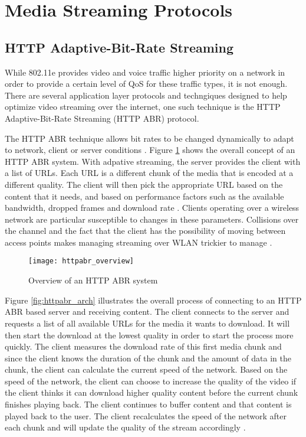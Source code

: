\documentclass[12pt]{article}
\begin{document}
\section{Media Streaming Protocols}

\subsection{HTTP Adaptive-Bit-Rate Streaming}
While 802.11e provides video and voice traffic higher priority on a network in order to provide a certain level of QoS for these traffic types, it is not enough.  There are several application layer protocols and techngiques designed to help optimize video streaming over the internet, one such technique is the HTTP Adaptive-Bit-Rate Streaming (HTTP ABR) protocol.

The HTTP ABR technique allows bit rates to be changed dynamically to adapt to network, client or server conditions \cite{7380453}.  Figure \ref{fig:httpabr_overview} shows the overall concept of an HTTP ABR system. With adpative streaming, the server provides the client with a list of URLs.  Each URL is a different chunk of the media that is encoded at a different quality.  The client will then pick the appropriate URL based on the content that it needs, and based on performance factors such as the available bandwidth, dropped frames and download rate \cite{httpabrtutorial}\cite{7057917}. Clients operating over a wireless network are particular susceptible to changes in these parameters.  Collisions over the channel and the fact that the client has the possibility of moving between access points makes managing streaming over WLAN trickier to manage \cite{10204452020150501}.

\begin{figure}[htb]
  \begin{center}
    \texttt{[image: httpabr\_overview]}
    \caption{Overview of an HTTP ABR system}
    \label{fig:httpabr_overview}
  \end{center}
\end{figure}

Figure \ref{fig:httpabr_arch} illustrates the overall process of connecting to an HTTP ABR based server and receiving content.  The client connects to the server and requests a list of all available URLs for the media it wants to download.  It will then start the download at the lowest quality in order to start the process more quickly.  The client measures the download rate of this first media chunk and since the client knows the duration
of the chunk and the amount of data in the chunk, the client can calculate the current speed of the network. Based on the speed of the network, the client can choose to increase the quality of the video if the client thinks it can download higher quality content before the current chunk finishes playing back. The client continues to buffer content and that content is played back to the user.  The client recalculates the speed of the network after each chunk and will update the quality of the stream accordingly \cite{5986186}.
\end{document}
